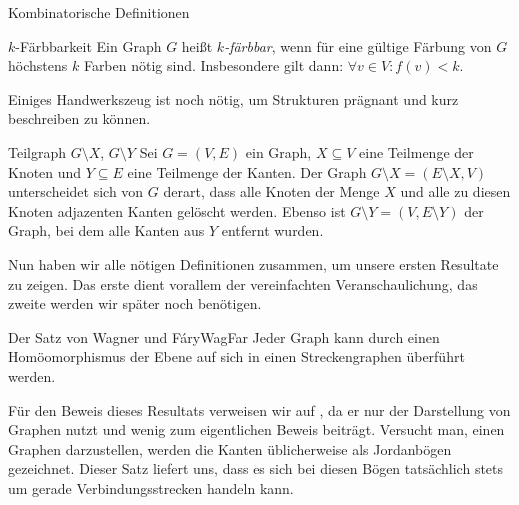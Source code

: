 \begin{section}{Kombinatorische Definitionen}
  \begin{definition}{$k$-Färbbarkeit}
   Ein Graph $G$ heißt \textit{$k$-färbbar}, wenn für eine gültige Färbung von $G$ höchstens $k$ Farben nötig sind. Insbesondere gilt dann: $\forall v \in V: f(v) < k$.
  \end{definition}
  
  Einiges Handwerkszeug ist noch nötig, um Strukturen prägnant und kurz beschreiben zu können.
  
  \begin{definition}{Teilgraph $G\setminus X$, $G\setminus Y$}
   Sei $G=(V,E)$ ein Graph, $X \subseteq V$ eine Teilmenge der Knoten und $Y \subseteq E$ eine Teilmenge der Kanten. Der Graph $G\setminus X = (E\setminus X,V)$ unterscheidet sich von $G$ derart, dass alle Knoten der Menge $X$ und alle zu diesen Knoten adjazenten Kanten gelöscht werden. Ebenso ist $G\setminus Y = (V,E\setminus Y)$ der Graph, bei dem alle Kanten aus $Y$ entfernt wurden.
  \end{definition}
  
  Nun haben wir alle nötigen Definitionen zusammen, um unsere ersten Resultate zu zeigen. Das erste dient vorallem der vereinfachten Veranschaulichung, das zweite werden wir später noch benötigen.
  
  \begin{satzl}{Der Satz von Wagner und Fáry}{WagFar}
   Jeder Graph kann durch einen Homöomorphismus der Ebene auf sich in einen Streckengraphen überführt werden.
  \end{satzl}
  
  Für den Beweis dieses Resultats verweisen wir auf \cite[Seite 113]{fritsch}, da er nur der Darstellung von Graphen nutzt und wenig zum eigentlichen Beweis beiträgt. Versucht man, einen Graphen darzustellen, werden die Kanten üblicherweise als Jordanbögen gezeichnet. Dieser Satz liefert uns, dass es sich bei diesen Bögen tatsächlich stets um gerade Verbindungsstrecken handeln kann.


\end{section}
